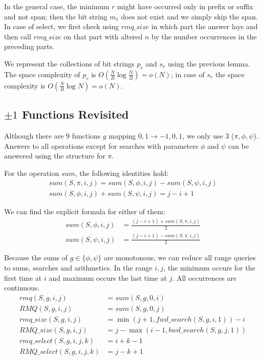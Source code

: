 In the general case, the minimum $r$ might have occurred only in prefix or suffix and not span; then the bit string $m_r$ does not exist and we simply skip the span.
In case of select, we first check using $rmq\_size$ in which part the answer lays and then call $rmq\_size$ on that part with altered $n$ by the number occurrences in the preceding parts.

We represent the collections of bit strings $p_r$ and $s_r$ using the previous lemma. 
The space complexity of $p_r$ is $O\left(\frac{N}{B} \log \frac{N}{B}\right) = o(N)$; in case of $s_r$ the space complexity is $O\left(\frac{N}{B} \log N \right) = o(N)$.

\subsection{$\pm 1$ Functions Revisited}

Although there are 9 functions $g$ mapping ${0, 1} \to {-1, 0, 1}$, we only use 3 ($\pi, \phi, \psi$).
Answers to all operations except for searches with parameters $\phi$ and $\psi$ can be answered using the structure for $\pi$.

For the operation $sum$, the following identities hold:
\begin{gather*}
	sum(S, \pi, i, j) = sum(S, \phi, i, j) - sum(S, \psi, i, j) \\
	sum(S, \phi, i, j) + sum(S, \psi, i, j) = j - i + 1
\end{gather*}

We can find the explicit formula for either of them:
\begin{align*}
	sum(S, \phi, i, j) &= \frac{(j - i + 1) + sum(S, \pi, i, j)}{2} \\
	sum(S, \psi, i, j) &= \frac{(j - i + 1) - sum(S, \pi, i, j)}{2}
\end{align*}

Because the sums of $g \in \{\phi, \psi \}$ are monotonous, we can reduce all range queries to sums, searches and arithmetics.
In the range $i, j$, the minimum occurs for the first time at $i$ and maximum occurs the last time at $j$.
All occurrences are continuous.
\begin{align*}
	rmq(S, g, i, j) &= sum(S, g, 0, i) \\
	RMQ(S, g, i, j) &= sum(S, g, 0, j) \\
	rmq\_size(S, g, i, j) &= \min(j + 1, fwd\_search(S, g, i, 1)) - i \\
	RMQ\_size(S, g, i, j) &= j - \max(i - 1, bwd\_search(S, g, j, 1)) \\
	rmq\_select(S, g, i, j, k) &= i + k - 1 \\ 
	RMQ\_select(S, g, i, j, k) &= j - k + 1
\end{align*}

